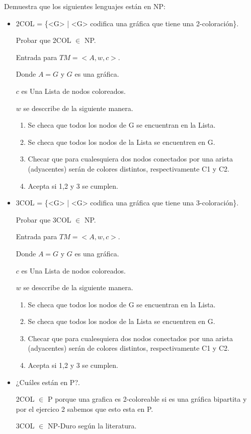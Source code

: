 \documentclass[12pt]{article}
\begin{document}
Demuestra que los siguientes lenguajes están en NP:

 \begin{itemize}
  \item 2COL = \{<G> | <G> codifica una gráfica que tiene una 2-coloración\}.
  
  Probar que 2COL $\in$ NP.

  Entrada para $TM = <A,w,c>$.
  
Donde $A = G$ y $G$ es una gráfica.

$c$ es Una Lista de nodos coloreados.

$w$ se desccribe de la siguiente manera.

\begin{enumerate}
 \item Se checa que todos los nodos de G se encuentran en la Lista.
 \item Se checa que todos los nodos de la Lista se encuentren en G.
 \item Checar que para cualesquiera dos nodos conectados por una arista (adyacentes) serán de colores distintos, respectivamente C1 y C2.
 \item Acepta si 1,2 y 3 se cumplen.
\end{enumerate}

  \item 3COL = \{<G> | <G> codifica una gráfica que tiene una 3-coloración\}.
  
  Probar que 3COL $\in$ NP.

  Entrada para $TM = <A,w,c>$.
  
Donde $A = G$ y $G$ es una gráfica.

$c$ es Una Lista de nodos coloreados.

$w$ se desccribe de la siguiente manera.

\begin{enumerate}
 \item Se checa que todos los nodos de G se encuentran en la Lista.
 \item Se checa que todos los nodos de la Lista se encuentren en G.
 \item Checar que para cualesquiera dos nodos conectados por una arista (adyacentes) serán de colores distintos, respectivamente C1 y C2.
 \item Acepta si 1,2 y 3 se cumplen.
\end{enumerate}

  \item  ¿Cuáles están en P?.
  
  2COL $\in$ P porque una grafica es 2-coloreable si es una gráfica bipartita y por el ejercico 2 sabemos que esto esta en P.
  
  3COL $\in$ NP-Duro según la literatura.


 \end{itemize}
\end{document}
